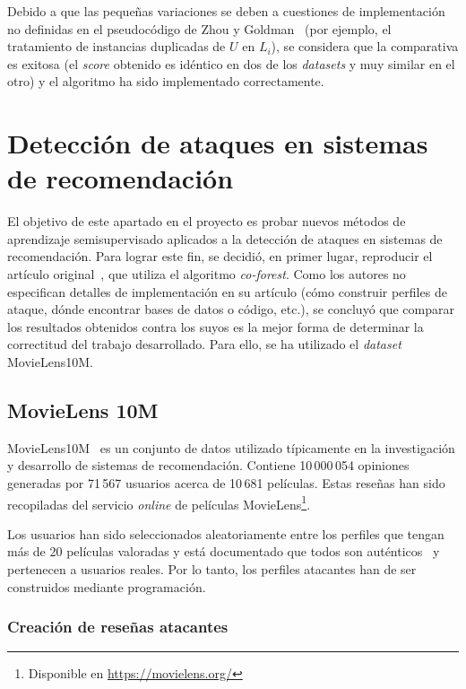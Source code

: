 Debido a que las pequeñas variaciones se deben a cuestiones de implementación no definidas en el pseudocódigo de Zhou y Goldman~\cite{democraticCoLearning2004original} (por ejemplo, el tratamiento de instancias duplicadas de $U$ en $L_i$), se considera que la comparativa es exitosa (el \textit{score} obtenido es idéntico en dos de los \textit{datasets} y muy similar en el otro) y el algoritmo ha sido implementado correctamente.


\section{Detección de ataques en sistemas de recomendación}
\label{sec:5_detec_ataques}
El objetivo de este apartado en el proyecto es probar nuevos métodos de aprendizaje semisupervisado aplicados a la detección de ataques en sistemas de recomendación. Para lograr este fin, se decidió, en primer lugar, reproducir el artículo original~\cite{zhou2021SemisupervisedRecommendationAttack}, que utiliza el algoritmo \textit{co-forest}. Como los autores no especifican detalles de implementación en su artículo (cómo construir perfiles de ataque, dónde encontrar bases de datos o código, etc.), se concluyó que comparar los resultados obtenidos contra los suyos es la mejor forma de determinar la correctitud del trabajo desarrollado. Para ello, se ha utilizado el \textit{dataset} MovieLens10M.

\subsection{MovieLens 10M}

MovieLens10M~\cite{groupLensDatasets} es un conjunto de datos utilizado típicamente en la investigación y desarrollo de sistemas de recomendación. Contiene 10\,000\,054 opiniones generadas por 71\,567 usuarios acerca de 10\,681 películas. Estas reseñas han sido recopiladas del servicio \textit{online} de películas MovieLens\footnote{ Disponible en {\url{https://movielens.org/}}}.

Los usuarios han sido seleccionados aleatoriamente entre los perfiles que tengan más de 20 películas valoradas y está documentado que todos son auténticos~\cite{zhou2021SemisupervisedRecommendationAttack} y pertenecen a usuarios reales. Por lo tanto, los perfiles atacantes han de ser construidos mediante programación.

\subsubsection{Creación de reseñas atacantes}
\label{sec:creacion_reseñas_atacantes}

